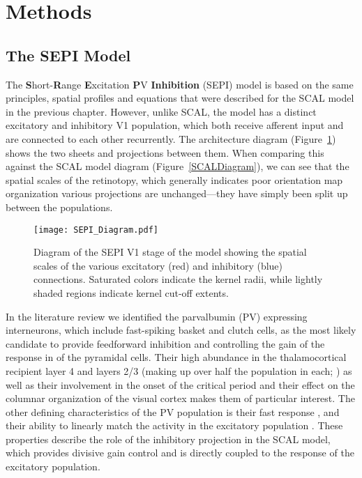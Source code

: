 \section{Methods}

\subsection{The SEPI Model}

The \textbf{S}hort-\textbf{R}ange \textbf{E}xcitation \textbf{P}V
\textbf{Inhibition} (SEPI) model is based on the same principles,
spatial profiles and equations that were described for the SCAL model
in the previous chapter. However, unlike SCAL, the model has a
distinct excitatory and inhibitory V1 population, which both receive
afferent input and are connected to each other recurrently. The
architecture diagram (Figure~\ref{SEPIDiagram}) shows the two sheets
and projections between them. When comparing this against the SCAL
model diagram (Figure~\ref{SCALDiagram}), we can see that the
spatial scales of the retinotopy, which generally indicates poor
orientation map organization various projections are unchanged---they
have simply been split up between the populations.

\begin{figure}
	\centering
        \texttt{[image: SEPI\_Diagram.pdf]}
	\caption{Diagram of the SEPI V1 stage of the model showing the
          spatial scales of the various excitatory (red) and
          inhibitory (blue) connections. Saturated colors indicate the
          kernel radii, while lightly shaded regions indicate kernel
          cut-off extents.}
	\label{SEPIDiagram}
\end{figure}

In the literature review we identified the parvalbumin (PV) expressing
interneurons, which include fast-spiking basket and clutch cells, as
the most likely candidate to provide feedforward inhibition and
controlling the gain of the response in of the pyramidal cells. Their
high abundance in the thalamocortical recipient layer 4 and layers 2/3
(making up over half the population in each;
\citealt{VanBrederode1990}) as well as their involvement in the onset
of the critical period \citep{Fagiolini2000} and their effect on the
columnar organization of the visual cortex \citep{Hensch2004} makes
them of particular interest. The other defining characteristics of the
PV population is their fast response
\citep{Cruikshank2007,Gabernet2005}, and their ability to linearly
match the activity in the excitatory population
\citep{Atallah2012}. These properties describe the role of the
inhibitory projection in the SCAL model, which provides divisive gain
control and is directly coupled to the response of the excitatory
population.

